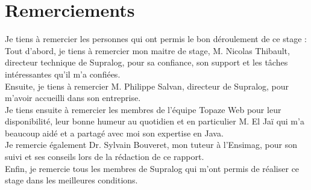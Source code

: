 \newpage
\section*{Remerciements}

Je tiens à remercier les personnes qui ont permis le bon déroulement de ce stage : \\

Tout d'abord, je tiens à remercier mon maitre de stage, M. Nicolas Thibault, directeur technique de Supralog, pour sa confiance, son support et les tâches intéressantes qu'il m'a confiées.\\

Ensuite, je tiens à remercier M. Philippe Salvan, directeur de Supralog, pour m'avoir accueilli dans son entreprise.\\

Je tiens ensuite à remercier les membres de l'équipe Topaze Web pour leur disponibilité, leur bonne humeur au quotidien et en particulier M. El Jaï qui m'a beaucoup aidé et a partagé avec moi son expertise en Java.\\

Je remercie également Dr. Sylvain Bouveret, mon tuteur à l'Ensimag, pour son suivi et ses conseils lors de la rédaction de ce rapport.\\

Enfin, je remercie tous les membres de Supralog qui m'ont permis de réaliser ce stage dans les meilleures conditions.

